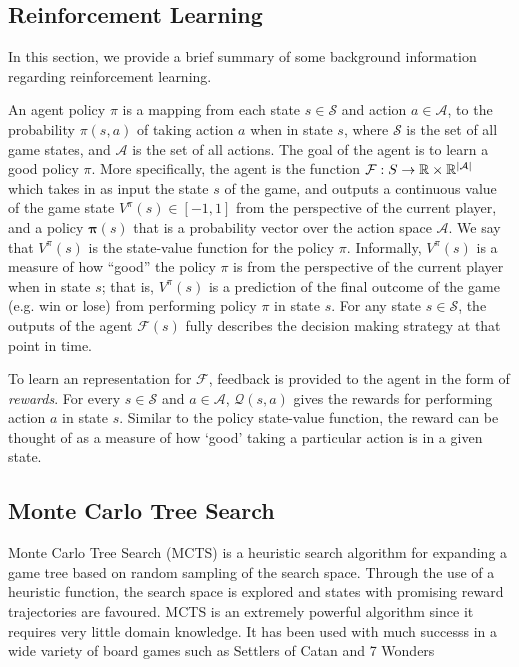\documentclass{paper}
\let\vec\mathbf
\begin{document}
\subsection{Reinforcement Learning}
In this section, we provide a brief summary of some background information regarding reinforcement learning.

An agent policy $\pi$ is a mapping from each state $s\in \mathcal{S}$ and action $a\in \mathcal{A}$, to the probability $\pi(s, a)$ of taking action $a$ when in state $s$, where $\mathcal{S}$ is the set of all game states, and $\mathcal{A}$ is the set of all actions. The goal of the agent is to learn a good policy $\pi$. More specifically, the agent is the function $\mathcal{F} : {S} \to \mathbb{R}\times\mathbb{R}^{|{\mathcal{A}}|}$ which takes in as input the state $s$ of the game, and outputs a continuous value of the game state $V^\pi(s)\in[-1,1]$ from the perspective of the current player, and a policy $\vec{\pi}(s)$ that is a probability vector over the action space ${\mathcal{A}}$. We say that $V^\pi(s)$ is the state-value function for the policy $\pi$. Informally, $V^\pi(s)$ is a measure of how ``good'' the policy $\pi$ is from the perspective of the current player when in state $s$; that is, $V^\pi(s)$ is a prediction of the final outcome of the game (e.g. win or lose) from performing policy $\pi$ in state $s$. For any state $s\in\mathcal{S}$, the outputs of the agent $\mathcal{F}(s)$ fully describes the decision making strategy at that point in time. 

To learn an representation for $\mathcal{F}$, feedback is provided to the agent in the form of \textit{rewards}. For every $s\in\mathcal{S}$ and $a\in\mathcal{A}$, $\mathcal{Q}(s,a)$ gives the rewards for performing action $a$ in state $s$. Similar to the policy state-value function, the reward can be thought of as a measure of how `good' taking a particular action is in a given state.

\subsection{Monte Carlo Tree Search}

Monte Carlo Tree Search (MCTS) is a heuristic search algorithm for expanding a game tree based on random sampling of the search space.  Through the use of a heuristic function, the search space is explored and states with promising reward trajectories are favoured. MCTS is an extremely powerful algorithm since it requires very little domain knowledge. It has been used with much successs in a wide variety of board games such as Settlers of Catan and 7 Wonders \cite{inproceedings}
\end{document}
